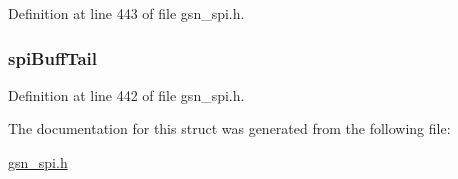 Definition at line 443 of file gsn\_\-spi.h.

\hypertarget{a00240_a0f15b8dada019c7bc412bb5577e7e1a9}{
\subsubsection[{spiBuffTail}]{ {\bf spiBuffTail}}}
\label{a00240_a0f15b8dada019c7bc412bb5577e7e1a9}


Definition at line 442 of file gsn\_\-spi.h.



The documentation for this struct was generated from the following file:\begin{DoxyCompactItemize}
\item 
\hyperlink{a00587}{gsn\_\-spi.h}\end{DoxyCompactItemize}
